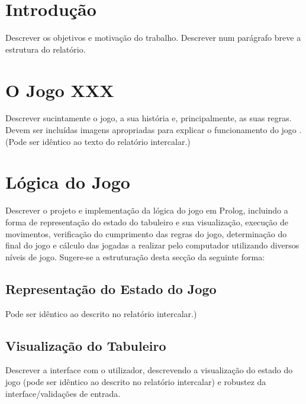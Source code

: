 \documentclass[a4paper]{article}
\begin{document}
\newpage




\newpage

\section{Introdução}

Descrever os objetivos e motivação do trabalho. Descrever num parágrafo breve a estrutura do relatório.


\section{O Jogo XXX}

Descrever sucintamente o jogo, a sua história e, principalmente, as suas regras. Devem ser incluídas imagens apropriadas para explicar o funcionamento do jogo \cite{CodigoSite}. (Pode ser idêntico ao texto do relatório intercalar.)


\section{Lógica do Jogo}

Descrever o projeto e implementação da lógica do jogo em Prolog, incluindo a forma de representação do estado do tabuleiro e sua visualização, execução de movimentos, verificação do cumprimento das regras do jogo, determinação do final do jogo e cálculo das jogadas a realizar pelo computador utilizando diversos níveis de jogo. Sugere-se a estruturação desta secção da seguinte forma:

\subsection{Representação do Estado do Jogo} 
Pode ser idêntico ao descrito no relatório intercalar.)


\subsection{Visualização do Tabuleiro} 
Descrever a interface com o utilizador, descrevendo a visualização do estado do jogo (pode ser idêntico ao descrito no relatório intercalar) e robustez da interface/validações de entrada.
\end{document}
